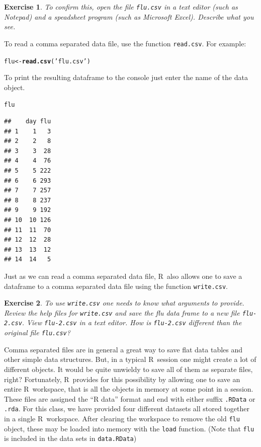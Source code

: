 \documentclass{article}\usepackage[]{graphicx}\usepackage[]{color}
\makeatletter
\newcommand{\hlstr}[1]{\textcolor[rgb]{0.192,0.494,0.8}{#1}}%
\newcommand{\hlstd}[1]{\textcolor[rgb]{0.345,0.345,0.345}{#1}}%
\newcommand{\hlkwb}[1]{\textcolor[rgb]{0.69,0.353,0.396}{#1}}%
\newcommand{\hlkwd}[1]{\textcolor[rgb]{0.737,0.353,0.396}{\textbf{#1}}}%
\newenvironment{kframe}{%
 \def\at@end@of@kframe{}%
 \ifinner\ifhmode%
  \def\at@end@of@kframe{\end{minipage}}%
  \begin{minipage}{\columnwidth}%
 \fi\fi%
 \def\FrameCommand##1{\hskip\@totalleftmargin \hskip-\fboxsep
 \colorbox{shadecolor}{##1}\hskip-\fboxsep
     \hskip-\linewidth \hskip-\@totalleftmargin \hskip\columnwidth}%
 \MakeFramed {\advance\hsize-\width
   \@totalleftmargin\z@ \linewidth\hsize
   \@setminipage}}%
 {\par\unskip\endMakeFramed%
 \at@end@of@kframe}
\newenvironment{knitrout}{}{} %
\newcommand{\R}{\textsf{R}}
\newcommand{\code}[1]{\texttt{#1}}
\theoremstyle{exercise}
\newtheorem{exercise}{Exercise}
\makeatother
\begin{document}
\begin{exercise}
  To confirm this, open the file \texttt{flu.csv} in a text editor (such as Notepad) and a speadsheet program (such as Microsoft Excel). Describe what you see.
\end{exercise}

To read a comma separated data file, use the function \code{read.csv}. For example:

\begin{knitrout}
\color{fgcolor}\begin{kframe}
\begin{alltt}
\hlstd{flu} \hlkwb{<-} \hlkwd{read.csv}\hlstd{(}\hlstr{'flu.csv'}\hlstd{)}
\end{alltt}
\end{kframe}
\end{knitrout}

To print the resulting dataframe to the console just enter the name of the data object.

\begin{knitrout}
\color{fgcolor}\begin{kframe}
\begin{alltt}
\hlstd{flu}
\end{alltt}
\begin{verbatim}
##    day flu
## 1    1   3
## 2    2   8
## 3    3  28
## 4    4  76
## 5    5 222
## 6    6 293
## 7    7 257
## 8    8 237
## 9    9 192
## 10  10 126
## 11  11  70
## 12  12  28
## 13  13  12
## 14  14   5
\end{verbatim}
\end{kframe}
\end{knitrout}

Just as we can read a comma separated data file, \R\ also allows one to save a dataframe to a comma separated data file using the function \code{write.csv}.

\begin{exercise}
  To use \texttt{write.csv} one needs to know what arguments to provide. Review the help files for \code{write.csv} and save the flu data frame to a new file \texttt{flu-2.csv}. View \texttt{flu-2.csv} in a text editor. How is \texttt{flu-2.csv} different than the original file \texttt{flu.csv}?
\end{exercise}

Comma separated files are in general a great way to save flat data tables and other simple data structures. But, in a typical \R\ session one might create a lot of different objects. It would be quite unwieldy to save all of them as separate files, right? Fortunately, \R\ provides for this possibility by allowing one to save an entire \R\ workspace, that is all the objects in memory at some point in a session. These files are assigned the ``R data'' format and end with either suffix \texttt{.RData} or \texttt{.rda}. For this class, we have provided four different datasets all stored together in a single \R\ workspace. After clearing the workspace to remove the old \code{flu} object, these may be loaded into memory with the \code{load} function. (Note that \code{flu} is included in the data sets in \texttt{data.RData})
\end{document}
